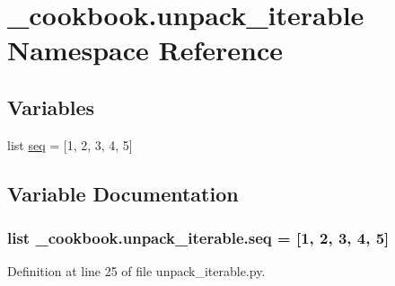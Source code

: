 \hypertarget{namespace__cookbook_1_1unpack__iterable}{\section{\-\_\-cookbook.\-unpack\-\_\-iterable Namespace Reference}
\label{namespace__cookbook_1_1unpack__iterable}
}
\subsection*{Variables}
\begin{DoxyCompactItemize}
\item 
list \hyperlink{namespace__cookbook_1_1unpack__iterable_a1051db43e28f2fffb3fd98c1c990ee7b}{seq} = \mbox{[}1, 2, 3, 4, 5\mbox{]}
\end{DoxyCompactItemize}


\subsection{Variable Documentation}
\hypertarget{namespace__cookbook_1_1unpack__iterable_a1051db43e28f2fffb3fd98c1c990ee7b}{
\subsubsection[{seq}]{\setlength{\rightskip}{0pt plus 5cm}list \-\_\-cookbook.\-unpack\-\_\-iterable.\-seq = \mbox{[}1, 2, 3, 4, 5\mbox{]}}}\label{namespace__cookbook_1_1unpack__iterable_a1051db43e28f2fffb3fd98c1c990ee7b}


Definition at line 25 of file unpack\-\_\-iterable.\-py.

